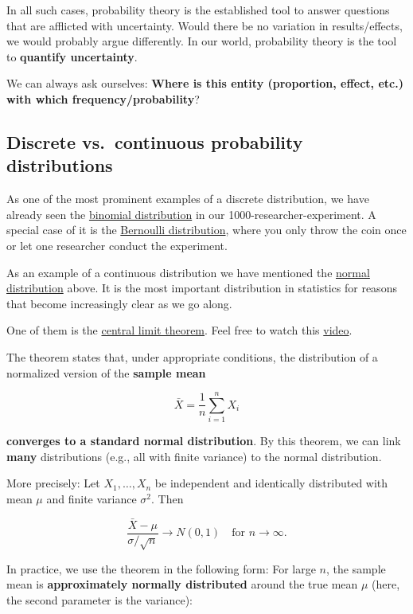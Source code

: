 \documentclass[
]{book}
\begin{document}
In all such cases, probability theory is the established tool to answer questions that are afflicted with uncertainty. Would there be no variation in results/effects,
we would probably argue differently. In our world, probability theory is the tool to \textbf{quantify uncertainty}.

We can always ask ourselves: \textbf{Where is this entity (proportion, effect, etc.) with which frequency/probability}?

\subsection{Discrete vs.~continuous probability distributions}\label{discrete_vs_continuous_probability_distributions}

As one of the most prominent examples of a discrete distribution, we have already seen
the \href{https://en.wikipedia.org/wiki/Binomial_distribution}{binomial distribution} in our 1000-researcher-experiment.
A special case of it is the \href{https://en.wikipedia.org/wiki/Bernoulli_distribution}{Bernoulli distribution},
where you only throw the coin once or let one researcher conduct the experiment.

As an example of a continuous distribution we have mentioned the \href{https://en.wikipedia.org/wiki/Normal_distribution}{normal distribution} above.
It is the most important distribution in statistics for reasons that become increasingly clear as we go along.

One of them is the \href{https://en.wikipedia.org/wiki/Central_limit_theorem}{central limit theorem}.
Feel free to watch this \href{https://www.youtube.com/watch?v=zeJD6dqJ5lo&t=28s&ab_channel=3Blue1Brown}{video}.

The theorem states that, under appropriate conditions, the distribution of a normalized version of the \textbf{sample
mean}

\[\bar{X} = \frac{1}{n}\sum_{i=1}^{n} X_i\]

\textbf{converges to a standard normal distribution}.
By this theorem, we can link \textbf{many} distributions (e.g., all with finite variance) to the normal distribution.

More precisely: Let \(X_1, \dots, X_n\) be independent and identically distributed with mean \(\mu\) and finite variance \(\sigma^2\). Then

\[\frac{\bar{X} - \mu}{\sigma / \sqrt{n}} \longrightarrow N(0, 1) \quad \text{for } n \to \infty.\]

In practice, we use the theorem in the following form: For large \(n\), the sample mean is \textbf{approximately normally distributed}
around the true mean \(\mu\) (here, the second parameter is the variance):
\end{document}
